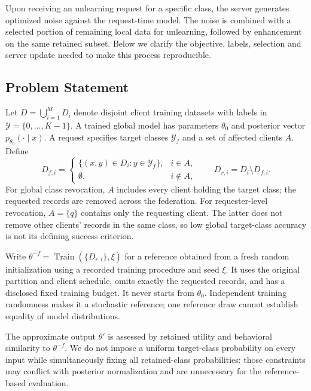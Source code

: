 \documentclass[software,article,submit,moreauthors]{Definitions/mdpi}
\begin{document}
Upon receiving an unlearning request for a specific class, the server generates
optimized noise against the request-time model. The noise is combined with a
selected portion of remaining local data for unlearning, followed by enhancement
on the same retained subset. Below we clarify the objective, labels, selection
and server update needed to make this process reproducible.

\subsection{Problem Statement}
\label{sec:scope}
Let $D=\bigcup_{i=1}^{M}D_i$ denote disjoint client training datasets with labels
in $\mathcal{Y}=\{0,\ldots,K-1\}$. A trained global model has parameters
$\theta_0$ and posterior vector $p_{\theta_0}(\cdot\mid x)$. A request specifies
target classes $\mathcal{Y}_f$ and a set of affected clients $A$. Define
\begin{equation}
D_{f,i}=\begin{cases}\{(x,y)\in D_i:y\in\mathcal{Y}_f\},&i\in A,\\
\emptyset,&i\notin A,\end{cases}
\qquad D_{r,i}=D_i\setminus D_{f,i}.
\label{eq:request}
\end{equation}
For global class revocation, $A$ includes every client holding the target class;
the requested records are removed across the federation. For requester-level
revocation, $A=\{q\}$ contains only the requesting client. The latter does not
remove other clients' records in the same class, so low global target-class
accuracy is not its defining success criterion.

Write $\theta^{-f}=\operatorname{Train}(\{D_{r,i}\},\xi)$ for a reference
obtained from a fresh random initialization using a recorded training procedure
and seed $\xi$. It uses the original partition and client schedule, omits exactly
the requested records, and has a disclosed fixed training budget. It never starts
from $\theta_0$. Independent training randomness makes it a stochastic reference;
one reference draw cannot establish equality of model distributions.

The approximate output $\theta'$ is assessed by retained utility and behavioral
similarity to $\theta^{-f}$. We do not impose a uniform target-class probability
on every input while simultaneously fixing all retained-class probabilities:
those constraints may conflict with posterior normalization and are unnecessary
for the reference-based evaluation.
\end{document}
